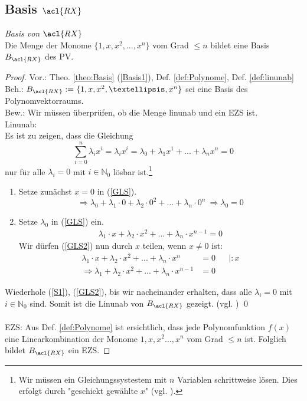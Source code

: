\subsection*{Basis $\acl{RX}$}

\theoremstyle{Lemma}
\begin{Lemma}{\emph{Basis von $\acl{RX}$}}
\\ Die Menge der Monome $\{1, x, x^2,…, x^n\}$ vom Grad $\leq n$ bildet eine Basis $B_{\acl{RX}}$ des \acl{PV}. 
\end{Lemma}

\begin{proof}
\label{BewBas}
Vor.: Theo. \ref{theo:Basis} (\ref{Basis1}), Def. \ref{def:Polynome}, Def. \ref{def:linunab}
\\ Beh.: $B_{\acl{RX}}:=\{1, x, x^2,…, x^n\}$ sei eine Basis des Polynomvektorraums.
\\ Bew.: Wir müssen überprüfen, ob die Menge \acl{linunab} und ein \acl{EZS} ist.  
\\ \acl{Linunab}:
\\ Es ist zu zeigen, dass die Gleichung \begin{equation}\label{GLS} \sum\limits_{i=0}^n \lambda_i x^i = \lambda_i x^i = \lambda_0 + \lambda_1 x^1 + ... + \lambda_n x^n = 0\end{equation} nur für alle $\lambda_i=0$ mit $i \in \mathbb{N}_0$ lösbar ist.\footnote{Wir müssen ein Gleichungssystestem mit $n$ Variablen schrittweise lösen. Dies erfolgt durch "geschickt gewählte $x$" (vgl. \cite[S. 308]{Tut}).}
\begin{enumerate}
\item \label{S1} Setze zunächst $x=0$ in (\ref{GLS}). 
\begin{equation}\Rightarrow \lambda_0 + \lambda_1 \cdot 0 + \lambda_2 \cdot 0^2 + ... + \lambda_n \cdot 0^n\ \Rightarrow \lambda_0 = 0 \end{equation}
\item Setze $\lambda_0$ in (\ref{GLS}) ein. 
\begin{align}
\label{GLS2} 
\lambda_1 \cdot x + \lambda_2 \cdot x^2+ ... + \lambda_n \cdot x^{n-1} = 0 
\end{align} Wir dürfen (\ref{GLS2}) nun durch $x$ teilen, wenn $x\not= 0$ ist: 
\begin{align}
\lambda_1 \cdot x + \lambda_2 \cdot x^2 +... + \lambda_n  \cdot x^n &= 0 && |:x \\ \Rightarrow \lambda_1 + \lambda_2 \cdot x^2+ ... + \lambda_n \cdot x^{n-1} &= 0
\end{align}
\end{enumerate}
Wiederhole (\ref{S1}), (\ref{GLS2}), bis wir nacheinander erhalten, dass alle $\lambda_i=0$ mit $i \in \mathbb{N}_0$ sind.
Somit ist die \acl{Linunab} von $B_{\acl{RX}}$ gezeigt. (vgl. \cite[S. 308]{Tut}) \qed
\\
\\ \acl{EZS}: Aus Def. \ref{def:Polynome} ist ersichtlich, dass jede Polynomfunktion $f(x)$ eine Linearkombination der Monome $1, x,x^2 …, x^n$ vom Grad $\leq n$ ist. Folglich bildet $B_{\acl{RX}}$ ein \acl{EZS}.
\end{proof}

